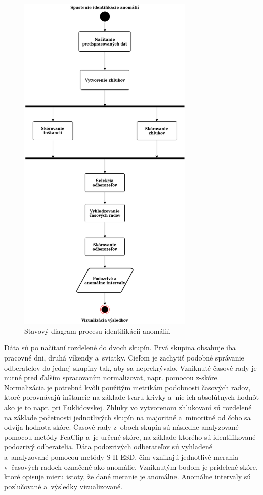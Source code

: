 \documentclass[a4paper,twoside,slovak,12pt,appendix]{article}
\begin{document}
\begin{figure}[htbp]
  \centering
  \includegraphics[width=0.75\textwidth]{state_diagram.png}
  \caption{Stavový diagram procesu identifikácií anomálií.}
  \label{fig:state-diagram}
\end{figure}

Dáta sú po načítaní rozdelené do dvoch skupín. Prvá skupina obsahuje iba
pracovné dni, druhá víkendy a~sviatky. Cieľom je zachytiť podobné správanie
odberateľov do jednej skupiny tak, aby sa neprekrývalo. Vzniknuté časové rady je
nutné pred ďalším spracovaním normalizovať, napr. pomocou z-skóre. Normalizácia
je potrebná kvôli použitým metrikám podobnosti časových radov, ktoré porovnávajú
inštancie na základe tvaru krivky a~nie ich absolútnych hodnôt ako je to napr.
pri Euklidovskej. Zhluky vo vytvorenom zhlukovaní sú rozdelené na základe
početnosti jednotlivých skupín na majoritné a~minoritné od čoho sa odvíja
hodnota skóre. Časové rady z~oboch skupín sú následne analyzované pomocou metódy
FeaClip a~je určené skóre, na základe ktorého sú identifikované podozrivý
odberatelia. Dáta podozrivých odberateľov sú vyhladené a~analyzované pomocou
metódy S-H-ESD, čím vznikajú jednotlivé merania v~časových radoch označené ako
anomálie. Vzniknutým bodom je pridelené skóre, ktoré opisuje mieru istoty, že
dané meranie je anomálne. Anomálne intervaly sú pozlučované a~výsledky
vizualizované.
\end{document}
